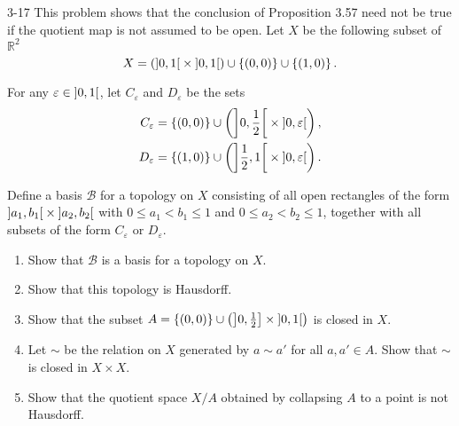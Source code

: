 \begin{problem}{3-17}
This problem shows that the conclusion of Proposition 3.57 need not be true if the quotient map is not assumed to be open. Let $X$ be the following subset of $\mathbb{R}^{2}$
\begin{equation*}
    X = \left(\left]{0, 1}\right[ \times \left]{0, 1}\right[\right) \cup \left\{{(0, 0)}\right\} \cup \left\{{(1, 0)}\right\}.
\end{equation*}

For any $\varepsilon \in \left]{0, 1}\right[$, let $C_{\varepsilon}$ and $D_{\varepsilon}$ be the sets
\begin{align*}
    C_{\varepsilon} & = \left\{{(0, 0)}\right\} \cup \left(\left]{0, \frac{1}{2}}\right[\times \left]{0, \varepsilon}\right[\right), \\
    D_{\varepsilon} & = \left\{{(1, 0)}\right\} \cup \left(\left]{\frac{1}{2}, 1}\right[\times \left]{0, \varepsilon}\right[\right).
\end{align*}

Define a basis $\mathscr{B}$ for a topology on $X$ consisting of all open rectangles of the form $\left]{a_{1}, b_{1}}\right[ \times \left]{a_{2}, b_{2}}\right[$ with $0\leq a_{1} < b_{1}\leq 1$ and $0\leq a_{2} < b_{2} \leq 1$, together with all subsets of the form $C_{\varepsilon}$ or $D_{\varepsilon}$.
\begin{enumerate}[label={(\alph*)}]
    \item Show that $\mathscr{B}$ is a basis for a topology on $X$.
    \item Show that this topology is Hausdorff.
    \item Show that the subset $A = \left\{{(0, 0)}\right\} \cup \left( \left]{0, \frac{1}{2}}\right] \times \left]{0,1}\right[ \right)$ is closed in $X$.
    \item Let $\sim$ be the relation on $X$ generated by $a \sim a'$ for all $a, a'\in A$. Show that $\sim$ is closed in $X\times X$.
    \item Show that the quotient space $X/A$ obtained by collapsing $A$ to a point is not Hausdorff.
\end{enumerate}
\end{problem}

